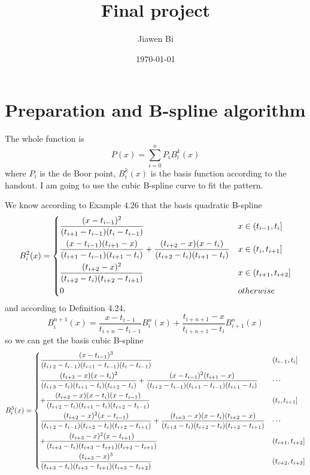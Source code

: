 \documentclass[]{article}
\title{Final project}
\author{Jiawen Bi}
\date{\today}
\begin{document}
\maketitle



\section{Preparation and B-spline algorithm}
\par
The whole function is $$
    P(x) = \sum_{i=0}^n P_i B_i^k(x)
   	$$
where $P_i$ is the de Boor point, $B_i^k(x)$ is the basis function according to the handout. 
I am going to use the cubic B-spline curve to fit the pattern.\par
We know according to Example 4.26 that the basis quadratic B-spline $$
	B_i^2(x) = \begin{dcases}
	\frac{(x-t_{i-1})^2}{(t_{i+1}-t_{i-1})(t_i - t_{i-1})} & x\in \left(t_{i-1},t_i\right] \\
	\frac{(x-t_{i-1})(t_{i+1}-x)}{(t_{i+1}-t_{i-1})(t_{i+1}-t_i)} + \frac{(t_{i+2}-x)(x-t_i)}{(t_{i+2}-t_i)(t_{i+1}-t_i)} & x\in \left(t_i,t_{i+1}\right] \\
	\frac{(t_{i+2}-x)^2}{(t_{i+2}-t_i)(t_{i+2}-t_{i+1})} & x\in \left(t_{i+1},t_{i+2} \right] \\
	0 & otherwise
	\end{dcases}
$$
and according to Definition 4.24, $$
	B_i^{n+1}(x) = \frac{x-t_{i-1}}{t_{i+n}-t_{i-1}}B_i^n(x) + \frac{t_{i+n+1} - x}{t_{i+n+1}-t_i} B_{i+1}^n(x)
$$
so we can get the basis cubic B-spline $$
	B_i^3(x) = \begin{dcases}
	\frac{(x-t_{i-1})^3}{(t_{i+2}-t_{i-1})(t_{i+1}-t_{i-1})(t_i-t_{i-1})} & \left(t_{i-1},t_i\right] \\
	\frac{(t_{i+3}-x)(x-t_{i})^2}{(t_{i+3}-t_i)(t_{i+1}-t_{i})(t_{i+2}-t_{i})} + \frac{(x-t_{i-1})^2(t_{i+1}-x)}{(t_{i+2}-t_{i-1})(t_{i+1}-t_{i-1})(t_{i+1}-t_i)} & \cdots \\ 
	 + \frac{(t_{i+2}-x)(x-t_i)(x-t_{i-1})}{(t_{i+2}-t_i)(t_{i+1}-t_i)(t_{i+2}-t_{i-1})} & \left(t_i,t_{i+1} \right] \\
	\frac{(t_{i+2}-x)^2(x-t_{i-1})}{(t_{i+2}-t_{i-1})(t_{i+2}-t_i)(t_{i+2}-t_{i+1})} + \frac{(t_{i+3}-x)(x-t_{i})(t_{i+2}-x)}{(t_{i+3}-t_i)(t_{i+2}-t_{i})(t_{i+2}-t_{i+1})} & \cdots\\
	+\frac{(t_{i+3}-x)^2(x-t_{i+1})}{(t_{i+3}-t_i)(t_{i+3}-t_{i+1})(t_{i+2}-t_{i+1})} & \left(t_{i+1},t_{i+2} \right] \\
	\frac{(t_{i+3}-x)^3}{(t_{i+3}-t_i)(t_{i+3}-t_{i+1})(t_{i+3}-t_{i+2})} & \left(t_{i+2},t_{i+3} \right]
	\end{dcases}
$$
\end{document}
